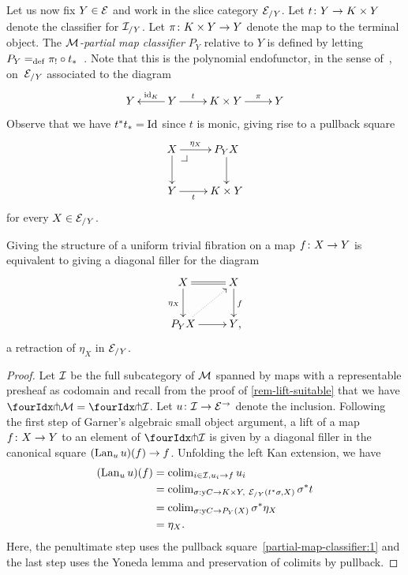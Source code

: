 \documentclass[reqno,10pt,a4paper,oneside,draft]{amsart}
\begin{document}
{{Let us now fix $Y \in \cal{E}$ and work in the slice category $\cal{E}_{/Y}$.
Let $t \co Y \to K \times Y$ denote the classifier for $\cal{I}_{/Y}$.
Let $\pi \co K \times Y \to Y$ denote the map to the terminal object.
The \emph{$\cal{M}$-partial map classifier} $P_Y$ relative to $Y$  is 
defined by letting $P_Y \defeq \pi_! \cc t_*$~\cite[A2.4]{johnstone:elephant}. Note that this
is the polynomial endofunctor, in the sense of~\cite{gambino-kock}, on~$\cal{E}_{/Y}$ 
associated to the diagram
\[
\xymatrix{
  Y
&
  Y
  \ar[l]_-{\id_K}
  \ar[r]^-{t}
&
  K \times Y
  \ar[r]^-{\pi}
&
  Y
}
\]
Observe that we have $t^* t_* = \Id$ since $t$ is monic, giving rise to a pullback square
\begin{equation} \label{partial-map-classifier:1}
\begin{gathered}
\xymatrix{
  X
  \ar[r]^-{\eta_X}
  \ar[d]
  \pullback{dr}
&
  P_Y X
  \ar[d]
\\
  Y
  \ar[r]_-{t}
&
  K \times Y
}
\end{gathered}
\end{equation}
for every $X \in \cal{E}_{/Y}$.



\begin{theorem} \label{thm:part-map-classifier}
Giving the structure of a uniform trivial fibration on a map $f \co X \to Y$ is equivalent to giving a diagonal filler for the diagram
\begin{equation*}
\begin{gathered}
\xymatrix{
  X
  \ar@{=}[r]
  \ar[d]_{\eta_X}
&
  X
  \ar[d]^{f}
\\
  P_Y X
  \ar[r]
  \ar@{.>}[ur]
&
  Y
\rlap{,}}
\end{gathered}
\end{equation*}
\ie a retraction of $\eta_X$ in $\cal{E}_{/Y}$.
\end{theorem}

\begin{proof}
Let $\cal{I}$ be the full subcategory of $\cal{M}$ spanned by maps with a representable presheaf as codomain
and recall from the proof of \cref{rem-lift-suitable} that we have $\liftr{\cal{M}} = \liftr{\cal{I}}$.
Let $u \co \cal{I} \to \cal{E}^\to$ denote the inclusion.
Following the first step of Garner's algebraic small object argument, a lift of a map $f \co X \to Y$ to an element of $\liftr{\cal{I}}$ is given by a diagonal filler in the canonical square $(\Lan_u u)(f) \to f$.
Unfolding the left Kan extension, we have
\begin{align*}
(\Lan_u u)(f)
&=
\colim_{i \in \cal{I}, u_i \to f} u_i
\\&=
\colim_{\sigma : \yon C \to K \times Y,\ \cal{E}_{/Y}(t^* \sigma, X)} \sigma^* t
\\&=
\colim_{\sigma : \yon C \to P_Y(X)} \sigma^* \eta_X
\\&=
\eta_X
.
\end{align*}
Here, the penultimate step uses the pullback square~\eqref{partial-map-classifier:1} and the last step uses the Yoneda lemma and preservation of colimits by pullback.
\end{proof}

}}
\end{document}
